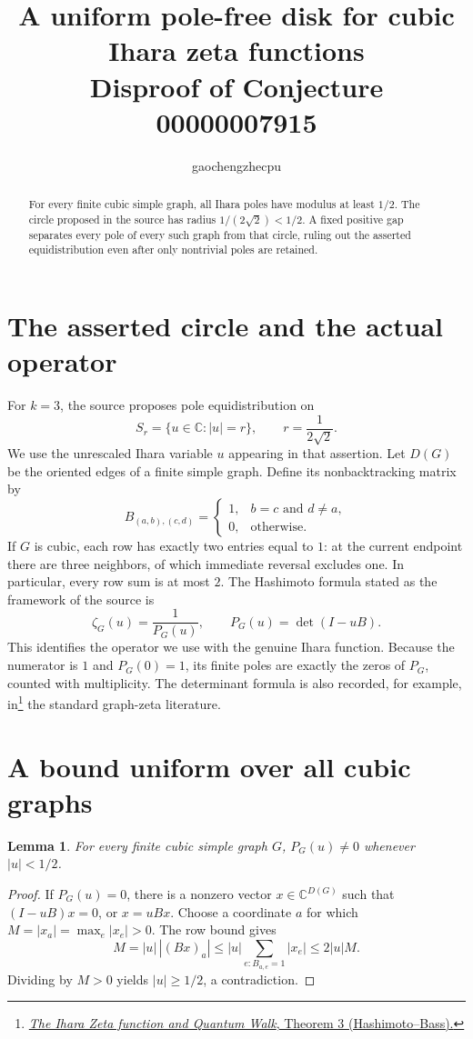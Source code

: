 \documentclass[11pt]{article}
\title{A uniform pole-free disk for cubic Ihara zeta functions\\
\large Disproof of Conjecture 00000007915}
\author{gaochengzhecpu}\date{}
\newtheorem{lemma}{Lemma}
\newcommand{\C}{\mathbb C}
\begin{document}
\maketitle
\begin{abstract}
For every finite cubic simple graph, all Ihara poles have modulus at
least $1/2$. The circle proposed in the source has radius
$1/(2\sqrt2)<1/2$. A fixed positive gap separates every pole of every
such graph from that circle, ruling out the asserted equidistribution
even after only nontrivial poles are retained.
\end{abstract}

\section*{The asserted circle and the actual operator}
For $k=3$, the source proposes pole equidistribution on
\[
 S_r=\{u\in\C:|u|=r\},\qquad r=\frac1{2\sqrt2}.
\]
We use the unrescaled Ihara variable $u$ appearing in that assertion.
Let $D(G)$ be the oriented edges of a finite simple graph. Define its
nonbacktracking matrix by
\[
 B_{(a,b),(c,d)}=
 \begin{cases}1,&b=c\text{ and }d\ne a,\\0,&\text{otherwise.}\end{cases}
\]
If $G$ is cubic, each row has exactly two entries equal to $1$:
at the current endpoint there are three neighbors, of which immediate
reversal excludes one. In particular, every row sum is at most $2$.
The Hashimoto formula stated as the framework of the source is
\[
 \zeta_G(u)=\frac{1}{P_G(u)},\qquad P_G(u)=\det(I-uB).
\]
This identifies the operator we use with the genuine Ihara function.
Because the numerator is $1$ and $P_G(0)=1$, its finite poles are
exactly the zeros of $P_G$, counted with multiplicity. The determinant
formula is also recorded, for example, in\footnote{\href{https://www.kurims.kyoto-u.ac.jp/~kyodo/kokyuroku/contents/pdf/2120-10.pdf}{\emph{The Ihara Zeta function and Quantum Walk}, Theorem 3 (Hashimoto--Bass).}}
the standard graph-zeta literature.

\section*{A bound uniform over all cubic graphs}
\begin{lemma}
For every finite cubic simple graph $G$, $P_G(u)\ne0$ whenever
$|u|<1/2$.
\end{lemma}
\begin{proof}
If $P_G(u)=0$, there is a nonzero vector $x\in\C^{D(G)}$ such that
$(I-uB)x=0$, or $x=uBx$. Choose a coordinate $a$ for which
$M=|x_a|=\max_e|x_e|>0$. The row bound gives
\[
 M=|u|\,|(Bx)_a|
   \le |u|\sum_{e:B_{a,e}=1}|x_e|
   \le 2|u|M.
\]
Dividing by $M>0$ yields $|u|\ge1/2$, a contradiction.
\end{proof}
\end{document}
